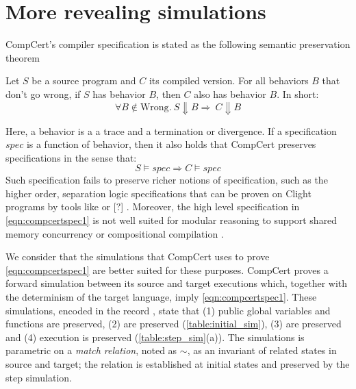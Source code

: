 \section{More revealing simulations}\label{sec:compcert-sim}

CompCert's compiler specification is stated as the following semantic preservation theorem

\begin{theorem}
Let $S$ be a source program and $C$ its compiled version. For all behaviors $B$ that don't go wrong, if $S$ has behavior $B$, then  
$C$ also has behavior $B$. In short:
\begin{equation}\forall B \not \in \text{Wrong}. \ S \Downarrow B \Rightarrow \ C \Downarrow B\label{eqn:compcertspec1}\end{equation}
\end{theorem}
Here, a behavior is a a trace and a termination or divergence. If a specification $spec$ is a function of behavior, then it also holds that CompCert preserves specifications in the sense that:
\begin{equation} S \models spec \Rightarrow C \models spec \end{equation}
Such specification fails to preserve richer notions of specification, such as the higher order, separation logic specifications that can be proven on Clight programs by tools like \cite{DBLP:journals/jar/CaoBGDA18} or [?]%
. Moreover, the high level specification in \ref{eqn:compcertspec1} is not well suited for modular reasoning to support shared memory concurrency or compositional compilation \cite{compcomp}. 

We consider that the simulations that CompCert uses to prove \ref{eqn:compcertspec1} are better suited for these purposes.
CompCert proves a forward simulation between its source and target executions which, together with the determinism of the target language, imply \ref{eqn:compcertspec1}. These simulations, encoded in the record , state that (1) public global variables and functions are preserved, (2)  are preserved (\ref{table:initial_sim}), (3)  are preserved and (4) execution is preserved (\ref{table:step_sim}(a)). The simulations is parametric on a \emph{match relation}, noted as $\overset{ }{\sim}$, as an invariant of related states in source and target; the relation is established at initial states and preserved by the step simulation. 


